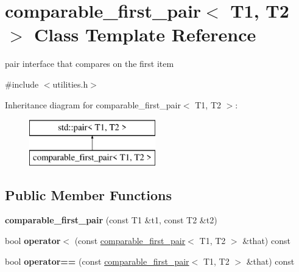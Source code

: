 \hypertarget{classcomparable__first__pair}{\section{comparable\-\_\-first\-\_\-pair$<$ T1, T2 $>$ Class Template Reference}
\label{classcomparable__first__pair}
}


pair interface that compares on the first item  




{\ttfamily \#include $<$utilities.\-h$>$}

Inheritance diagram for comparable\-\_\-first\-\_\-pair$<$ T1, T2 $>$\-:\begin{figure}[H]
\begin{center}
\leavevmode
\includegraphics[height=2.000000cm]{classcomparable__first__pair}
\end{center}
\end{figure}
\subsection*{Public Member Functions}
\begin{DoxyCompactItemize}
\item 
\hypertarget{classcomparable__first__pair_a2983fa9fde1ab3b1edc13b8dd37a913a}{{\bfseries comparable\-\_\-first\-\_\-pair} (const T1 \&t1, const T2 \&t2)}\label{classcomparable__first__pair_a2983fa9fde1ab3b1edc13b8dd37a913a}

\item 
\hypertarget{classcomparable__first__pair_a67562f833f477f952e86f4d6dc39e118}{bool {\bfseries operator$<$} (const \hyperlink{classcomparable__first__pair}{comparable\-\_\-first\-\_\-pair}$<$ T1, T2 $>$ \&that) const }\label{classcomparable__first__pair_a67562f833f477f952e86f4d6dc39e118}

\item 
\hypertarget{classcomparable__first__pair_aeb65ed4ea3789b102e7ef750cb72d875}{bool {\bfseries operator==} (const \hyperlink{classcomparable__first__pair}{comparable\-\_\-first\-\_\-pair}$<$ T1, T2 $>$ \&that) const }\label{classcomparable__first__pair_aeb65ed4ea3789b102e7ef750cb72d875}

\end{DoxyCompactItemize}


